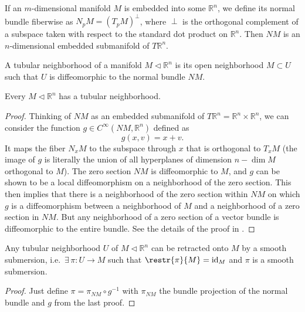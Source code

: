 \documentclass[english,letterpaper]{article}%
\numberwithin{equation}{section}
\numberwithin{figure}{section}
\numberwithin{table}{section}
\theoremstyle{definition}
\theoremstyle{definition}
\theoremstyle{definition}
\theoremstyle{plain}
\theoremstyle{plain}
\theoremstyle{plain}
\theoremstyle{plain}
\theoremstyle{remark}
\theoremstyle{remark}
\DeclareMathOperator{\id}{id}
\newcommand{\sub}{\vartriangleleft}
\begin{document}
\begin{defn}
    If an $m$-dimensional manifold $M$ is embedded into some $\mathbb{R}^n$, we define its normal bundle fiberwise as $N_p M=(T_p M)^\perp$, where $\perp$ is the orthogonal complement of a subspace taken with respect to the standard dot product on $\mathbb{R}^n$. Then $NM$ is an $n$-dimensional embedded submanifold of $T\mathbb{R}^n$.
\end{defn}

\begin{defn}
    A tubular neighborhood of a manifold $M\sub \mathbb{R}^n$ is its open neighborhood $M\subset U$ such that $U$ is diffeomorphic to the normal bundle $NM$.
\end{defn}

\begin{thm}
    Every $M\sub \mathbb{R}^n$ has a tubular neighborhood.
\end{thm}
\begin{proof}
    Thinking of $NM$ as an embedded submanifold of $T\mathbb{R}^n=\mathbb{R}^n\times\mathbb{R}^n$, we can consider the function $g\in C^\infty(NM,\mathbb{R}^n)$ defined as
    \[
        g(x,v)=x+v.
    \]
    It maps the fiber $N_x M$ to the subspace through $x$ that is orthogonal to $T_x M$ (the image of $g$ is literally the union of all hyperplanes of dimension $n-\dim M$ orthogonal to $M$).
    The zero section $NM$ is diffeomorphic to $M$, and $g$ can be shown to be a local diffeomorphism on a neighborhood of the zero section. This then implies that there is a neighborhood of the zero section within $NM$ on which $g$ is a diffeomorphism between a neighborhood of $M$ and a neighborhood of a zero section in $NM$. But any neighborhood of a zero section of a vector bundle is diffeomorphic to the entire bundle. See the details of the proof in \cite[Thm 6.24]{Lee}.
\end{proof}


\begin{thm}
Any tubular neighborhood $U$ of $M\sub\mathbb{R}^n$ can be retracted onto $M$ by a smooth submersion, i.e.\ $\exists\, \pi:U\to M$ such that $\restr{\pi}{M}=\id_M$ and $\pi$ is a smooth submersion.
\end{thm}
\begin{proof}
Just define $\pi= \pi_{NM}\circ g^{-1}$ with $\pi_{NM}$ the bundle projection of the normal bundle and $g$ from the last proof.
\end{proof}
\end{document}
